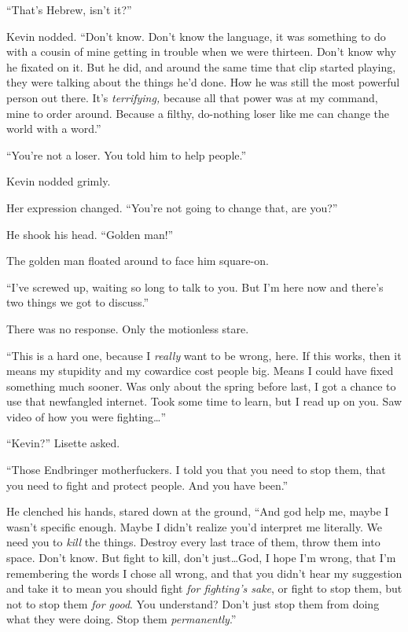 ``That's Hebrew, isn't it?''



Kevin nodded.  ``Don't know.  Don't know the language, it was something to do with a cousin of mine getting in trouble when we were thirteen.  Don't know why he fixated on it.  But he did, and around the same time that clip started playing, they were talking about the things he'd done.  How he was still the most powerful person out there.  It's \emph{terrifying, }because all that power was at my command, mine to order around.  Because a filthy, do-nothing loser like me can change the world with a word.''



``You're not a loser.  You told him to help people.''



Kevin nodded grimly.



Her expression changed.  ``You're not going to change that, are you?''



He shook his head.  ``Golden man!''



The golden man floated around to face him square-on.



``I've screwed up, waiting so long to talk to you.  But I'm here now and there's two things we got to discuss.''



There was no response.  Only the motionless stare.



``This is a hard one, because I \emph{really} want to be wrong, here.  If this works, then it means my stupidity and my cowardice cost people big.  Means I could have fixed something much sooner.  Was only about the spring before last, I got a chance to use that newfangled internet.  Took some time to learn, but I read up on you.  Saw video of how you were fighting\ldots''



``Kevin?'' Lisette asked.



``Those Endbringer motherfuckers.  I told you that you need to stop them, that you need to fight and protect people.  And you have been.''



He clenched his hands, stared down at the ground, ``And god help me, maybe I wasn't specific enough.  Maybe I didn't realize you'd interpret me literally.  We need you to \emph{kill} the things.  Destroy every last trace of them, throw them into space.  Don't know.  But fight to kill, don't just\ldots God, I hope I'm wrong, that I'm remembering the words I chose all wrong, and that you didn't hear my suggestion and take it to mean you should fight \emph{for fighting's sake}, or fight to stop them, but not to stop them \emph{for good}.  You understand?  Don't just stop them from doing what they were doing.  Stop them \emph{permanently}.''



